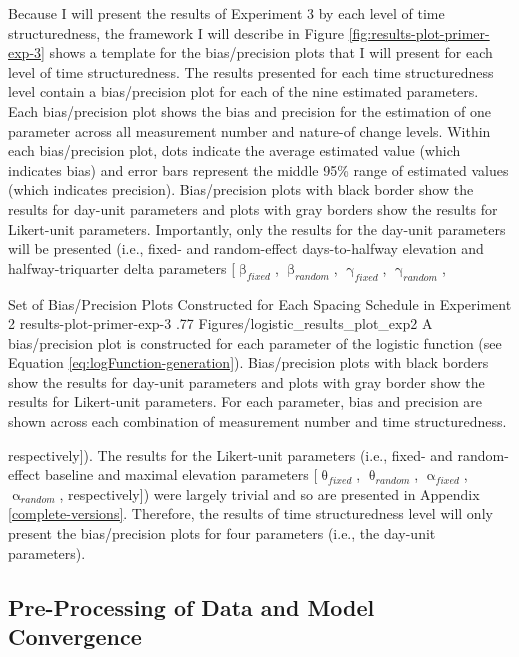 \documentclass[
12pt, %
twoside,
english]{guelphthesis}
\begin{document}
Because I will present the results of Experiment 3 by each level of time structuredness, the framework I will describe in Figure \ref{fig:results-plot-primer-exp-3} shows a template for the bias/precision plots that I will present for each level of time structuredness. The results presented for each time structuredness level contain a bias/precision plot for each of the nine estimated parameters. Each bias/precision plot shows the bias and precision for the estimation of one parameter across all measurement number and nature-of change levels. Within each bias/precision plot, dots indicate the average estimated value (which indicates bias) and error bars represent the middle 95\% range of estimated values (which indicates precision). Bias/precision plots with black border show the results for day-unit parameters and plots with gray borders show the results for Likert-unit parameters. Importantly, only the results for the day-unit parameters will be presented (i.e., fixed- and random-effect days-to-halfway elevation and halfway-triquarter delta parameters {[}\(\upbeta_{fixed}\), \(\upbeta_{random}\), \(\upgamma_{fixed}\), \(\upgamma_{random}\),
\begin{apaFigure}
[portrait]
[samepage]
[-0.2cm]
{Set of Bias/Precision Plots Constructed for Each Spacing Schedule in Experiment 2}
{results-plot-primer-exp-3}
{.77}
{Figures/logistic_results_plot_exp2}
{A bias/precision plot is constructed for each parameter of the logistic function (see Equation \ref{eq:logFunction-generation}). Bias/precision plots with black borders show the results for day-unit parameters and plots with gray border show the results for Likert-unit parameters. For each parameter, bias and precision are shown across each combination of measurement number and time structuredness.}
\end{apaFigure}
\noindent respectively{]}). The results for the Likert-unit parameters (i.e., fixed- and random-effect baseline and maximal elevation parameters {[}\(\uptheta_{fixed}\), \(\uptheta_{random}\), \(\upalpha_{fixed}\), \(\upalpha_{random}\), respectively{]}) were largely trivial and so are presented in Appendix \ref{complete-versions}. Therefore, the results of time structuredness level will only present the bias/precision plots for four parameters (i.e., the day-unit parameters).

\hypertarget{pre-processing-of-data-and-model-convergence-2}{%
\subsection{Pre-Processing of Data and Model Convergence}\label{pre-processing-of-data-and-model-convergence-2}}
\end{document}
